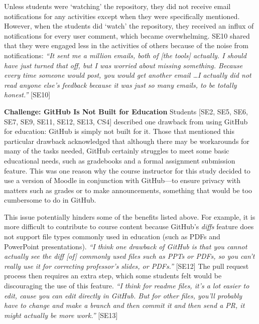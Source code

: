 Unless students were `watching' the repository, they did not receive email notifications for any activities except when they were specifically mentioned. However, when the students did `watch' the repository, they received an influx of notifications for every user comment, which became overwhelming. SE10 shared that they were engaged less in the activities of others because of the noise from notifications: \textit{``It sent me a million emails, both of [the tools] actually. I should have just turned that off, but I was worried about missing something. Because every time someone would post, you would get another email \ldots I actually did not read anyone else's feedback because it was just so many emails, to be totally honest.''} [SE10]


\textbf{Challenge: GitHub Is Not Built for Education}
Students [SE2, SE5, SE6, SE7, SE9, SE11, SE12, SE13, CS4] described one drawback from using GitHub for education: GitHub is simply not built for it. Those that mentioned this particular drawback acknowledged that although there may be workarounds for many of the tasks needed, GitHub certainly struggles to meet some basic educational needs, such as gradebooks and a formal assignment submission feature. This was one reason why the course instructor for this study decided to use a version of Moodle in conjunction with GitHub---to ensure privacy with matters such as grades or to make announcements, something that would be too cumbersome to do in GitHub.

This issue potentially hinders some of the benefits listed above. For example, it is more difficult to contribute to course content because GitHub's \emph{diffs} feature does not support file types commonly used in education (such as PDFs and PowerPoint presentations). \textit{``I think one drawback of GitHub is that you cannot actually see the diff [of] commonly used files such as PPTs or PDFs, so you can't really use it for correcting professor's slides, or PDFs.''} [SE12] The pull request process then requires an extra step, which some students felt would be discouraging the use of this feature. \textit{``I think for readme files, it's a lot easier to edit, cause you can edit directly in GitHub. But for other files, you'll probably have to change and make a branch and then commit it and then send a PR, it might actually be more work.''} [SE13]


